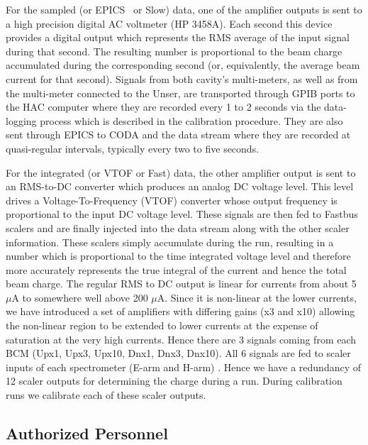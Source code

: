 {For the sampled (or EPICS~\cite{EPICSwww} or Slow) data, one of the amplifier outputs is sent to a 
high precision digital AC voltmeter (HP 3458A). Each second this device provides 
a digital output which represents the  RMS average of the input signal during that 
second.  The resulting number is  proportional to the beam charge accumulated 
during the corresponding second (or, equivalently, the average  beam current  for 
that second). Signals from both cavity's multi-meters, as well as from the 
multi-meter connected to the Unser, are transported through GPIB ports to the HAC 
computer where they are recorded every 1 to 2 seconds via the data-logging process 
which is described in the calibration procedure. They are also sent through EPICS 
to CODA and the data stream where they are recorded at  quasi-regular intervals, 
typically every two to five  seconds.

For the integrated (or VTOF or Fast) data, the other amplifier output is sent to an 
RMS-to-DC converter which   produces  an analog DC  voltage  level. This level 
drives a Voltage-To-Frequency (VTOF) converter whose output frequency is  
proportional to the  input DC voltage level. These signals are then fed to Fastbus  
scalers and are finally injected into the data stream along  with the other scaler 
information.  These scalers simply accumulate during  the run, resulting  in a 
number which is proportional to the time integrated voltage level and therefore 
more accurately represents the true integral of the current and hence the total 
beam charge. The regular RMS to DC output is linear for currents
from about 5 $\mu$A to somewhere well above 200 $\mu$A.
 Since it is non-linear at the lower 
currents, we have introduced a set of amplifiers with differing gains (x3 and x10) 
allowing the non-linear region to be extended to lower currents at the expense of 
saturation at the very high currents. Hence there are 3 signals coming 
from each BCM (Upx1, Upx3, Upx10, Dnx1, Dnx3, Dnx10). All 6 signals are fed 
to scaler inputs of each spectrometer (E-arm and H-arm) . Hence we have a 
redundancy of 12 scaler outputs for determining the charge during a run. During 
calibration runs we calibrate each of these scaler outputs.   
}

\begin{safetyen}{10}{10}
\subsection{ Authorized Personnel}
\end{safetyen}

